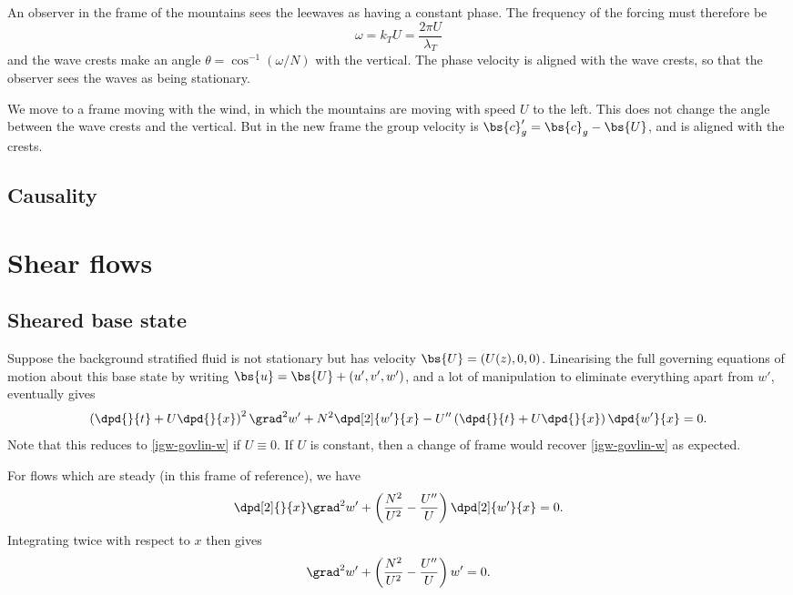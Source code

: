 An observer in the frame of the mountains sees the leewaves as having a constant phase. The frequency of the forcing must therefore be
\begin{equation}
	\omega = k_T U = \frac{2\pi U}{\lambda_T}
\end{equation}
and the wave crests make an angle $\theta = \cos^{-1} (\omega/N)$ with the vertical. The phase velocity is aligned with the wave crests, so that the observer sees the waves as being stationary.

We move to a frame moving with the wind, in which the mountains are moving with speed $U$ to the left. This does not change the angle between the wave crests and the vertical. But in the new frame the group velocity is $\bs{c}'_g = \bs{c}_g - \bs{U}$, and is aligned with the crests. 

\subsection{Causality}

\section{Shear flows}

\subsection{Sheared base state}

Suppose the background stratified fluid is not stationary but has velocity $\bs{U} = (U(z),0,0)$. Linearising the full governing equations of motion about this base state by writing $\bs{u} = \bs{U} + (u',v',w')$, and a lot of manipulation to eliminate everything apart from $w'$, eventually gives
\begin{equation}
	\left(\dpd{}{t} + U\dpd{}{x}\right)^2 \grad^2 w' + N^2 \dpd[2]{w'}{x} - U''\left(\dpd{}{t} + U\dpd{}{x}\right)\dpd{w'}{x} = 0.
\end{equation}
Note that this reduces to \ref{igw-govlin-w} if $U\equiv0$. If $U$ is constant, then a change of frame would recover \ref{igw-govlin-w} as expected.

For flows which are steady (in this frame of reference), we have
\begin{equation}
	\dpd[2]{}{x} \grad^2 w' + \left( \frac{N^2}{U^2} - \frac{U''}{U} \right)\dpd[2]{w'}{x} = 0.
\end{equation}
Integrating twice with respect to $x$ then gives
\begin{equation}
	\grad^2 w' + \left( \frac{N^2}{U^2} - \frac{U''}{U} \right) w' = 0.
\end{equation}

